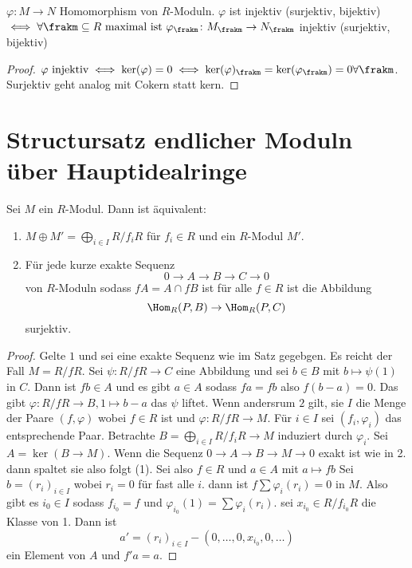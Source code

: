 \begin{Kor}\label{Kor:LokSurjInjBij}
	\(\varphi\colon M\to N\) Homomorphism von \(R\)-Moduln.
	\(\varphi\) ist injektiv (surjektiv, bijektiv) \(\iff \forall \frakm\subseteq R \text{ maximal ist } \varphi_\frakm\colon M_\frakm\to N_\frakm\) injektiv (surjektiv, bijektiv) 
\end{Kor}
\begin{proof}
	\(\varphi \text{ injektiv} \iff \ker(\varphi)=0\iff \ker(\varphi)_\frakm=\ker(\varphi_\frakm)=0 \forall \frakm\). Surjektiv geht analog mit Cokern statt kern.
\end{proof}
\section{Structursatz endlicher Moduln über Hauptidealringe}
\begin{Lemma}\label{Lem:SpaltenModDirSum}
	Sei \(M\) ein \(R\)-Modul. Dann ist äquivalent:
	\begin{enumerate}
		\item \(M\oplus M'=\bigoplus_{i\in I}R/f_iR\) für \(f_i\in R\) und ein \(R\)-Modul \(M'\).
		\item Für jede kurze exakte Sequenz \[0\to A\to B\to C\to 0\] von \(R\)-Moduln sodass \(fA=A\cap fB\) ist für alle \(f\in R\) ist die Abbildung \[\Hom_R(P,B)\to\Hom_R(P,C)\] surjektiv.
	\end{enumerate}
\end{Lemma}
\begin{proof}
	Gelte \(1\) und sei eine exakte Sequenz wie im Satz gegebgen. Es reicht der Fall \(M=R/fR\). Sei \(\psi\colon R/fR\to C\) eine Abbildung und sei \(b\in B\) mit \(b\mapsto \psi(1)\) in \(C\). Dann ist \(fb\in A\) und es gibt \(a\in A\) sodass \(fa=fb\) also \(f(b-a)=0\). Das gibt \(\varphi\colon R/fR\to B, 1\mapsto b-a\) das \(\psi\) liftet.
	Wenn andersrum \(2\) gilt, sie \(I\) die Menge der Paare \((f,\varphi)\) wobei \(f\in R\) ist und \(\varphi\colon R/fR\to M\). Für \(i\in I\) sei \((f_i,\varphi_i)\) das entsprechende Paar.
	Betrachte \(B=\bigoplus_{i\in I}R/f_iR\to M\) induziert durch \(\varphi_i\). Sei \(A=\ker(B\to M)\).
	Wenn die Sequenz \(0\to A\to B\to M\to 0\) exakt ist wie in 2. dann spaltet sie also folgt (1). Sei also \(f\in R\) und \(a\in A\) mit \(a\mapsto fb\) Sei \(b=(r_i)_{i\in I}\) wobei \(r_i=0\) für fast alle \(i\). dann ist \(f\sum\varphi_i(r_i)=0\) in \(M\). Also gibt es \(i_0\in I\) sodass \(f_{i_0}=f\) und \(\varphi_{i_0}(1)=\sum\varphi_i(r_i)\). sei \(x_{i_0}\in R/f_{i_0}R\) die Klasse von 1. Dann ist \[a'=(r_i)_{i\in I}-(0,\dots,0,x_{i_0},0,\dots)\] ein Element von \(A\) und \(f'a=a\).
\end{proof}
